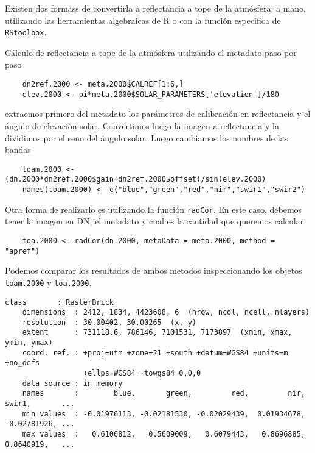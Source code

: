 Existen dos formass de convertirla a reflectancia a tope de la atm\'osfera: a mano,
utilizando las herramientas algebraicas de R o con la funci\'on
especifica de \texttt{RStoolbox}.

\begin{exa}
    C\'alculo de reflectancia a tope de la atm\'osfera
    utilizando el metadato paso por paso

    \begin{lstlisting}
    dn2ref.2000 <- meta.2000$CALREF[1:6,]
    elev.2000 <- pi*meta.2000$SOLAR_PARAMETERS['elevation']/180
    \end{lstlisting}
    extraemos primero del metadato los par\'ametros de calibraci\'on en
    reflectancia y el \'angulo de elevaci\'on solar. Convertimos luego la imagen
    a reflectancia y la dividimos por el seno del \'angulo solar.
    Luego cambiamos los nombres de las bandas

    \begin{lstlisting}
    toam.2000 <- (dn.2000*dn2ref.2000$gain+dn2ref.2000$offset)/sin(elev.2000)
    names(toam.2000) <- c("blue","green","red","nir","swir1","swir2")
    \end{lstlisting}

    Otra forma de realizarlo es utilizando la funci\'on
    \texttt{radCor}. En este caso, debemos tener la imagen en DN, el metadato y
    cual es la cantidad que queremos calcular.

    \begin{lstlisting}
    toa.2000 <- radCor(dn.2000, metaData = meta.2000, method = "apref")
    \end{lstlisting}

    Podemos comparar los resultados de ambos metodos inspeccionando los objetos
    \texttt{toam.2000} y \texttt{toa.2000}.
    \begin{Verbatim}[fontsize=\small]
    class       : RasterBrick
    dimensions  : 2412, 1834, 4423608, 6  (nrow, ncol, ncell, nlayers)
    resolution  : 30.00402, 30.00265  (x, y)
    extent      : 731118.6, 786146, 7101531, 7173897  (xmin, xmax, ymin, ymax)
    coord. ref. : +proj=utm +zone=21 +south +datum=WGS84 +units=m +no_defs
                  +ellps=WGS84 +towgs84=0,0,0
    data source : in memory
    names       :        blue,       green,         red,         nir,    swir1,       ...
    min values  : -0.01976113, -0.02181530, -0.02029439,  0.01934678,    -0.02781926, ...
    max values  :   0.6106812,   0.5609009,   0.6079443,   0.8696885,    0.8640919,   ...
    \end{Verbatim}


\end{exa}
